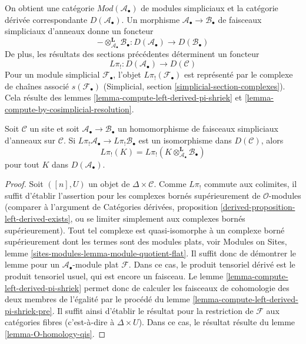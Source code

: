 \noindent
On obtient une catégorie $\textit{Mod}(\mathcal{A}_\bullet)$ de modules
simpliciaux et la catégorie dérivée correspondante
$D(\mathcal{A}_\bullet)$. Un morphisme
$\mathcal{A}_\bullet \to \mathcal{B}_\bullet$ de faisceaux simpliciaux
d'anneaux donne un foncteur
$$
- \otimes^\mathbf{L}_{\mathcal{A}_\bullet} \mathcal{B}_\bullet :
D(\mathcal{A}_\bullet)
\longrightarrow
D(\mathcal{B}_\bullet)
$$
De plus, les résultats des sections précédentes déterminent un foncteur
$$
L\pi_! : D(\mathcal{A}_\bullet) \longrightarrow D(\mathcal{C})
$$
Pour un module simplicial $\mathcal{F}_\bullet$, l'objet
$L\pi_!(\mathcal{F}_\bullet)$ est représenté par le complexe de chaînes
associé $s(\mathcal{F}_\bullet)$ (Simplicial, section
\ref{simplicial-section-complexes}). Cela résulte des lemmes
\ref{lemma-compute-left-derived-pi-shriek} et
\ref{lemma-compute-by-cosimplicial-resolution}.

\begin{lemma}
\label{lemma-base-change-by-qis}
Soit $\mathcal{C}$ un site et soit
$\mathcal{A}_\bullet \to \mathcal{B}_\bullet$ un homomorphisme de faisceaux
simpliciaux d'anneaux sur $\mathcal{C}$. Si
$L\pi_!\mathcal{A}_\bullet \to L\pi_!\mathcal{B}_\bullet$ est un
isomorphisme dans $D(\mathcal{C})$, alors
$$
L\pi_!(K) =
L\pi_!(K \otimes^\mathbf{L}_{\mathcal{A}_\bullet} \mathcal{B}_\bullet)
$$
pour tout $K$ dans $D(\mathcal{A}_\bullet)$.
\end{lemma}

\begin{proof}
Soit $([n], U)$ un objet de $\Delta \times \mathcal{C}$. Comme $L\pi_!$
commute aux colimites, il suffit d'établir l'assertion pour les complexes
bornés supérieurement de $\mathcal{O}$-modules (comparer à l'argument de
Catégories dérivées, proposition
\ref{derived-proposition-left-derived-exists}, ou se limiter simplement aux
complexes bornés supérieurement). Tout tel complexe est quasi-isomorphe à un
complexe borné supérieurement dont les termes sont des modules plats, voir
Modules on Sites, lemme \ref{sites-modules-lemma-module-quotient-flat}. Il
suffit donc de démontrer le lemme pour un
$\mathcal{A}_\bullet$-module plat $\mathcal{F}$. Dans ce cas, le produit
tensoriel dérivé est le produit tensoriel usuel, qui est encore un faisceau.
Le lemme \ref{lemma-compute-left-derived-pi-shriek} permet donc de calculer
les faisceaux de cohomologie des deux membres de l'égalité par le procédé du
lemme \ref{lemma-compute-left-derived-pi-shriek-pre}. Il suffit ainsi
d'établir le résultat pour la restriction de $\mathcal{F}$ aux catégories
fibres (c'est-à-dire à $\Delta \times U$). Dans ce cas, le résultat résulte du
lemme \ref{lemma-O-homology-qis}.
\end{proof}

